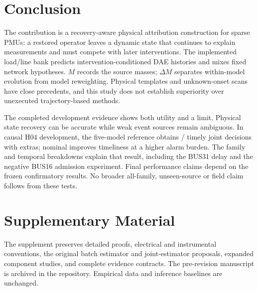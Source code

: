 \section{Conclusion}
\label{sec:conclusion}

The contribution is a recovery-aware physical attribution construction for sparse PMUs: a restored operator leaves a dynamic state that continues to explain measurements and must compete with later interventions. The implemented load/line bank predicts intervention-conditioned DAE histories and mixes fixed network hypotheses. $M$ records the source masses; $\Delta M$ separates within-model evolution from model reweighting. Physical templates and unknown-onset scans have close precedents, and this study does not establish superiority over unexecuted trajectory-based methods.

The completed development evidence shows both utility and a limit. Physical state recovery can be accurate while weak event sources remain ambiguous. In causal H04 development, the five-model reference obtains \ContMixTimely{}/\ContMixTotal{} timely joint decisions with \ContMixExtras{} extras; nominal improves timeliness at a higher alarm burden. The family and temporal breakdowns explain that result, including the BUS31 delay and the negative BUS16 admission experiment. Final performance claims depend on the frozen confirmatory results. No broader all-family, unseen-source or field claim follows from these tests.

\section*{Supplementary Material}
The supplement preserves detailed proofs, electrical and instrumental conventions, the original batch estimator and joint-estimator proposals, expanded component studies, and complete evidence contracts. The pre-revision manuscript is archived in the repository. Empirical data and inference baselines are unchanged.
